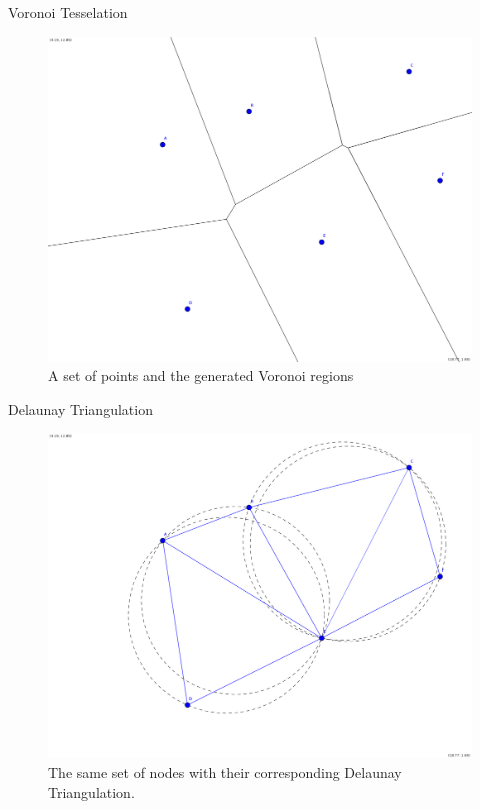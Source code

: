 \documentclass[11pt]{beamer}
\begin{document}
\begin{frame}{Voronoi Tesselation}
	\begin{figure}
		\centering
		\includegraphics[width=0.5\linewidth]{figs/new_voronoi}
		\caption{A set of points and the generated Voronoi regions}
		\label{fig:new_voronoi}
	\end{figure}
\end{frame}


\begin{frame}{Delaunay Triangulation}
	\begin{figure}
		\centering
		\includegraphics[width=0.5\linewidth]{figs/delaunay}
		\caption{The same set of nodes with their corresponding Delaunay Triangulation.}
		\label{fig:delaunay}
	\end{figure}
\end{frame}
\end{document}
